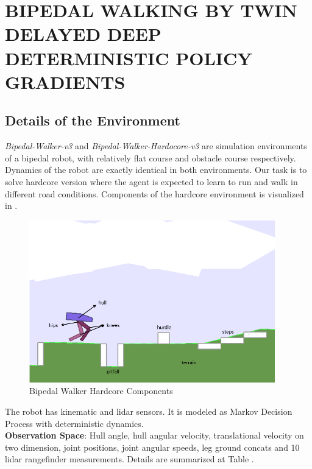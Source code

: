 \chapter{BIPEDAL WALKING BY TWIN DELAYED DEEP DETERMINISTIC POLICY GRADIENTS}
\label{chap:exp_setup}

\section{Details of the Environment}
\textit{Bipedal-Walker-v3} and \textit{Bipedal-Walker-Hardocore-v3} are simulation environments of a bipedal robot, with relatively flat course and obstacle course respectively. Dynamics of the robot are exactly identical in both environments. Our task is to solve hardcore version where the agent is expected to learn to run and walk in different road conditions. Components of the hardcore environment is visualized in . \\
\begin{figure}
	\centering
	\includegraphics[width=0.95\textwidth]{figures/bipedal/bpedal_annotated.png}
	\caption{Bipedal Walker Hardcore Components}
	\label{fig:bipedal_hardcore_components}
\end{figure}
The robot has kinematic and lidar sensors. It is modeled as Markov Decision Process with deterministic dynamics. \\
\textbf{Observation Space}: Hull angle, hull angular velocity, translational velocity on two dimension, joint positions, joint angular speeds, leg ground concats and 10 lidar rangefinder measurements. Details are summarized at Table . \\
